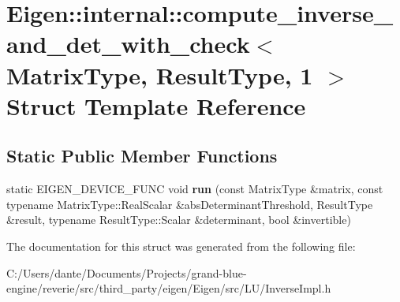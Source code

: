 \hypertarget{struct_eigen_1_1internal_1_1compute__inverse__and__det__with__check_3_01_matrix_type_00_01_result_type_00_011_01_4}{}\section{Eigen\+::internal\+::compute\+\_\+inverse\+\_\+and\+\_\+det\+\_\+with\+\_\+check$<$ Matrix\+Type, Result\+Type, 1 $>$ Struct Template Reference}
\label{struct_eigen_1_1internal_1_1compute__inverse__and__det__with__check_3_01_matrix_type_00_01_result_type_00_011_01_4}
\subsection*{Static Public Member Functions}
\begin{DoxyCompactItemize}
\item 
\mbox{\label{struct_eigen_1_1internal_1_1compute__inverse__and__det__with__check_3_01_matrix_type_00_01_result_type_00_011_01_4_af65bd555cb7b2aa48208364a4beea8be}} 
static E\+I\+G\+E\+N\+\_\+\+D\+E\+V\+I\+C\+E\+\_\+\+F\+U\+NC void {\bfseries run} (const Matrix\+Type \&matrix, const typename Matrix\+Type\+::\+Real\+Scalar \&abs\+Determinant\+Threshold, Result\+Type \&result, typename Result\+Type\+::\+Scalar \&determinant, bool \&invertible)
\end{DoxyCompactItemize}


The documentation for this struct was generated from the following file\+:\begin{DoxyCompactItemize}
\item 
C\+:/\+Users/dante/\+Documents/\+Projects/grand-\/blue-\/engine/reverie/src/third\+\_\+party/eigen/\+Eigen/src/\+L\+U/Inverse\+Impl.\+h\end{DoxyCompactItemize}
